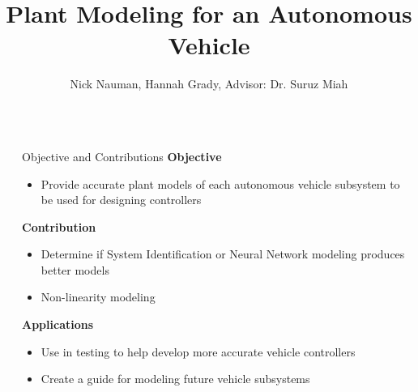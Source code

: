 \documentclass[final]{beamer}
\title{Plant Modeling for an Autonomous Vehicle} %
\author{Nick Nauman, Hannah Grady, Advisor: Dr. Suruz Miah} %
\institute{Department of Electrical and Computer Engineering, Bradley University, Peoria IL} %
\newlength{\sepwid}
\newlength{\onecolwid}
\begin{document}

\setlength{\belowcaptionskip}{2ex} %

\begin{frame}[t] %

\begin{columns}[t]

\begin{column}{\sepwid}\end{column} %

\begin{column}{\onecolwid} %


\begin{alertblock}{Objective and Contributions}
%
\textbf{Objective}
\begin{itemize}
    \item Provide accurate plant models of each autonomous vehicle subsystem to be used for designing controllers
\end{itemize}
%
\textbf{Contribution}
\begin{itemize}
	\item Determine if System Identification or Neural Network modeling produces better models 
	\item Non-linearity modeling
\end{itemize}
\textbf{Applications}
\begin{itemize}
	\item Use in testing to help develop more accurate vehicle controllers
	\item Create a guide for modeling future vehicle subsystems
\end{itemize}


\end{alertblock}
\end{column}
\end{columns}
\end{frame}
\end{document}
